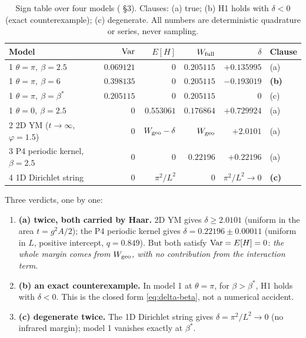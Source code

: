 \begin{table}[h]
\centering\footnotesize
\setlength{\tabcolsep}{5pt}
\renewcommand{\arraystretch}{1.12}
\begin{tabularx}{\textwidth}{@{}>{\raggedright}p{3.6cm} r r r r l@{}}
\toprule
\textbf{Model} & $\operatorname{Var}$ & $E[H]$ & $W_{\mathrm{full}}$ & $\delta$ & \textbf{Clause}\\
\midrule
1 \; $\theta=\pi,\ \beta=2.5$ & $0.069121$ & $0$ & $0.205115$ & $+0.135995$ & (a)\\
1 \; $\theta=\pi,\ \beta=6$ & $0.398135$ & $0$ & $0.205115$ & $\mathbf{-0.193019}$ & \textbf{(b)}\\
1 \; $\theta=\pi,\ \beta=\beta^{*}$ & $0.205115$ & $0$ & $0.205115$ & $0$ & (c)\\
1 \; $\theta=0,\ \beta=2.5$ & $0$ & $0.553061$ & $0.176864$ & $+0.729924$ & (a)\\
2 \; 2D YM ($t\to\infty$, $\varphi=1.5$) & $0$ & $W_{\mathrm{geo}}-\delta$ & $W_{\mathrm{geo}}$ & $+2.0101$ & (a)\\
3 \; P4 periodic kernel, $\beta=2.5$ & $0$ & $0$ & $0.22196$ & $+0.22196$ & (a)\\
4 \; 1D Dirichlet string & $0$ & $\pi^{2}/L^{2}$ & $0$ & $\pi^{2}/L^{2}\to0$ & \textbf{(c)}\\
\bottomrule
\end{tabularx}
\caption{Sign table over four models ( \S3). Clauses: (a) true; (b) H1 holds with
$\delta<0$ (exact counterexample); (c) degenerate. All numbers are deterministic quadrature or
series, never sampling.}
\label{tab:four}
\end{table}

Three verdicts, one by one: \LT
\begin{enumerate}[label=(\alph*)]
\item \textbf{(a) twice, both carried by Haar.} 2D YM gives $\delta\ge2.0101$ (uniform in the area
      $t=g^{2}A/2$); the P4 periodic kernel gives $\delta=0.22196\pm0.00011$ (uniform in $L$, positive
      intercept, $q=0.849$). But both satisfy $\operatorname{Var}=E[H]=0$: \emph{the whole margin comes from
      $W_{\mathrm{geo}}$, with no contribution from the interaction term}.
\item \textbf{(b) an exact counterexample.} In model 1 at $\theta=\pi$, for $\beta>\beta^{*}$, H1
      holds with $\delta<0$. This is the closed form \eqref{eq:delta-beta}, not a numerical accident.
\item \textbf{(c) degenerate twice.} The 1D Dirichlet string gives $\delta=\pi^{2}/L^{2}\to0$ (no
      infrared margin); model 1 vanishes exactly at $\beta^{*}$.
\end{enumerate}

